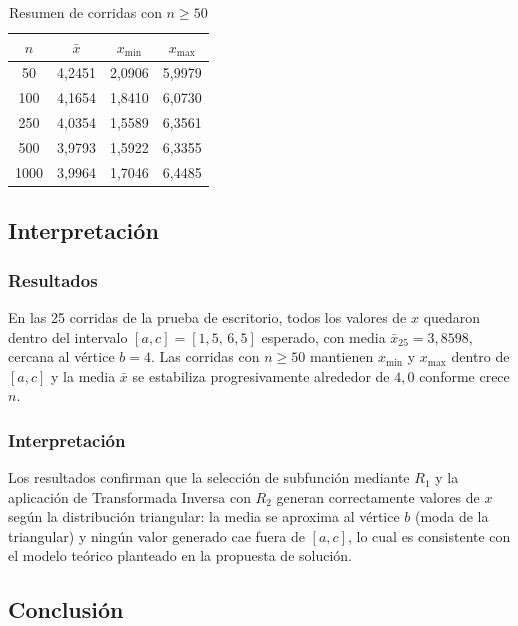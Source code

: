 \documentclass[12pt, a4paper]{article}
\newenvironment{mitabla}[2][H]{%
  \begin{table}[#1]
  \centering
  \caption{#2}
  \small
}{%
  \end{table}
}
\begin{document}
\begin{mitabla}[H]{\texorpdfstring{Resumen de corridas con $n \geq 50$}{Resumen de corridas con n mayor igual 50}}
\begin{tabular}{cccc}
\toprule
$n$ & $\bar{x}$ & $x_{\min}$ & $x_{\max}$ \\
\midrule
50   & 4,2451 & 2,0906 & 5,9979 \\
100  & 4,1654 & 1,8410 & 6,0730 \\
250  & 4,0354 & 1,5589 & 6,3561 \\
500  & 3,9793 & 1,5922 & 6,3355 \\
1000 & 3,9964 & 1,7046 & 6,4485 \\
\bottomrule
\end{tabular}
\end{mitabla}

\subsection{Interpretación}

\subsubsection{Resultados}

En las 25 corridas de la prueba de escritorio, todos los valores de $x$ quedaron dentro del intervalo $[a,c]=[1{,}5,\,6{,}5]$ esperado, con media $\bar{x}_{25}=3{,}8598$, cercana al vértice $b=4$. Las corridas con $n \geq 50$ mantienen $x_{\min}$ y $x_{\max}$ dentro de $[a,c]$ y la media $\bar{x}$ se estabiliza progresivamente alrededor de $4{,}0$ conforme crece $n$.

\subsubsection{Interpretación}

Los resultados confirman que la selección de subfunción mediante $R_1$ y la aplicación de Transformada Inversa con $R_2$ generan correctamente valores de $x$ según la distribución triangular: la media se aproxima al vértice $b$ (moda de la triangular) y ningún valor generado cae fuera de $[a,c]$, lo cual es consistente con el modelo teórico planteado en la propuesta de solución.

\subsection{Conclusión}
\end{document}
